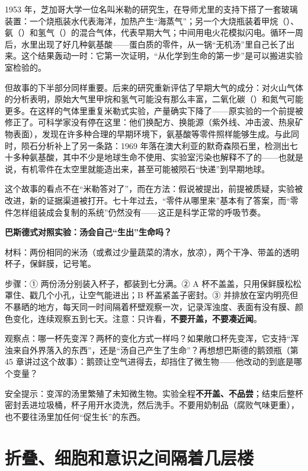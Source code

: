 \begin{zhengju}
1953 年，芝加哥大学一位名叫米勒的研究生，在导师尤里的支持下搭了一套玻璃装置：一个烧瓶装水代表海洋，加热产生“海蒸气”；另一个大烧瓶装着甲烷（）、氨（）和氢气（）的混合气体，代表早期大气；中间用电火花模拟闪电。循环一周后，水里出现了好几种氨基酸——蛋白质的零件，从一锅“无机汤”里自己长了出来。这个结果轰动一时：它第一次证明，“从化学到生命的第一步”是可以搬进实验室检验的。

但故事的下半部分同样重要。后来的研究重新评估了早期大气的成分：对火山气体的分析表明，原始大气里甲烷和氢气可能没有那么丰富，二氧化碳（）和氮气可能更多。在这样的气体里重复米勒式实验，产量确实下降了——原实验的一个前提被修正了。可科学家没有停在这里：他们换配方、换能源（紫外线、冲击波、热泉矿物表面），发现在许多种合理的早期环境下，氨基酸等零件照样能够生成。与此同时，陨石分析补上了另一条路：1969 年落在澳大利亚的默奇森陨石里，检测出七十多种氨基酸，其中不少是地球生命不使用、实验室污染也解释不了的——也就是说，有机零件在太空里就能造出来，甚至可能被陨石“快递”到早期地球。

这个故事的看点不在“米勒答对了”，而在方法：假说被提出，前提被质疑，实验被改进，新的证据渠道被打开。七十年过去，“零件从哪里来”基本有了答案，而“零件怎样组装成会复制的系统”仍然没有——这正是科学正常的呼吸节奏。
\end{zhengju}

\begin{shiyan}
\textbf{巴斯德式对照实验：汤会自己“生出”生命吗？}

材料：两份相同的米汤（或煮过少量蔬菜的清水，放凉），两个干净、带盖的透明杯子，保鲜膜，记号笔。

步骤：① 两份汤分别装入杯子，都装到七分满。② A 杯不盖盖，只用保鲜膜松松罩住、戳几个小孔，让空气能进出；B 杯盖紧盖子密封。③ 并排放在室内明亮但不暴晒的地方，每天同一时间隔着杯壁观察一次，记录浑浊度、表面有没有膜、颜色变化，连续观察五到七天。注意：只许看，\textbf{不要开盖，不要凑近闻}。

观察点：哪一杯先变浑？两杯的变化方式一样吗？如果敞口杯先变浑，它支持“浑浊来自外界落入的东西”，还是“汤自己产生了生命”？再想想巴斯德的鹅颈瓶（第 45 章讲过这个故事）：鹅颈让空气进得去，却挡住了微生物——他改动的到底是哪个变量？

安全提示：变浑的汤里繁殖了未知微生物。实验全程\textbf{不开盖、不品尝}；结束后整杯密封丢进垃圾桶，杯子用开水烫洗，然后洗手。不要用奶制品（腐败气味更重），也不要往汤里加任何“促生长”的东西。
\end{shiyan}

\section{折叠、细胞和意识之间隔着几层楼}


